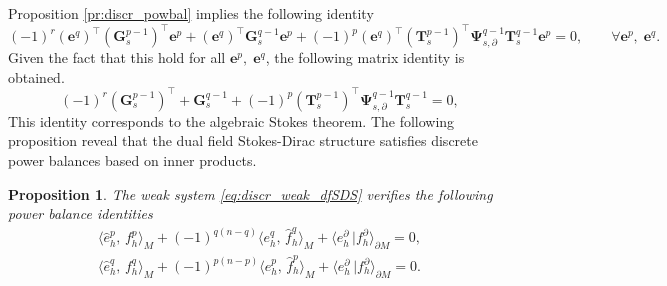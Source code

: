 \documentclass{elsarticle}
\newtheorem{proposition}{Proposition}
\newcommand*{\dual}[1]{\ensuremath{\widehat{#1}}}
\newcommand{\inpr}[3][]{\ensuremath{\langle #2, \, #3 \rangle_{#1}}}
\newcommand{\dualpr}[3][]{\ensuremath{\langle #2 \, \vert #3 \rangle_{#1}}}
\begin{document}
Proposition \ref{pr:discr_powbal} implies the following identity
\begin{equation*}
    (-1)^r(\mathbf{e}^q)^\top(\mathbf{G}^{p-1}_s)^\top \mathbf{e}^p + (\mathbf{e}^q)^\top\mathbf{G}^{q-1}_s \mathbf{e}^p+ (-1)^p (\mathbf{e}^q)^\top(\mathbf{T}_s^{p-1})^\top \mathbf{\Psi}^{q-1}_{s, \partial} \mathbf{T}_s^{q-1}\mathbf{e}^p = 0, \qquad \forall \mathbf{e}^p, \; \mathbf{e}^q.
\end{equation*}
Given the fact that this hold for all $\mathbf{e}^p, \; \mathbf{e}^q$, the following matrix identity is obtained.
\begin{equation}\label{eq:alg_StokesTh}
    (-1)^r(\mathbf{G}^{p-1}_s)^\top + \mathbf{G}^{q-1}_s + (-1)^p (\mathbf{T}_s^{p-1})^\top \mathbf{\Psi}^{q-1}_{s, \partial} \mathbf{T}_s^{q-1} = 0,
\end{equation}
This identity corresponds to the algebraic Stokes theorem. The following proposition reveal that the dual field Stokes-Dirac structure satisfies discrete power balances based on inner products.
\begin{proposition}\label{pr:discr_innerpowbal}
The weak system \eqref{eq:discr_weak_dfSDS} verifies the following power balance identities 
\begin{align}
\inpr[M]{\dual{e}^p_h}{f^p_h} + (-1)^{q(n-q)} \inpr[M]{e^q_h}{\dual{f}^q_h} + \dualpr[\partial M]{e^\partial_h}{f^\partial_h} = 0, \label{eq:powbal_14} \\
\inpr[M]{\dual{e}^q_h}{f^q_h} + (-1)^{p(n-p)} \inpr[M]{e^p_h}{\dual{f}^p_h} + \dualpr[\partial M]{e^\partial_h}{f^\partial_h} = 0. \label{eq:powbal_23}
\end{align}
\end{proposition}
\end{document}
